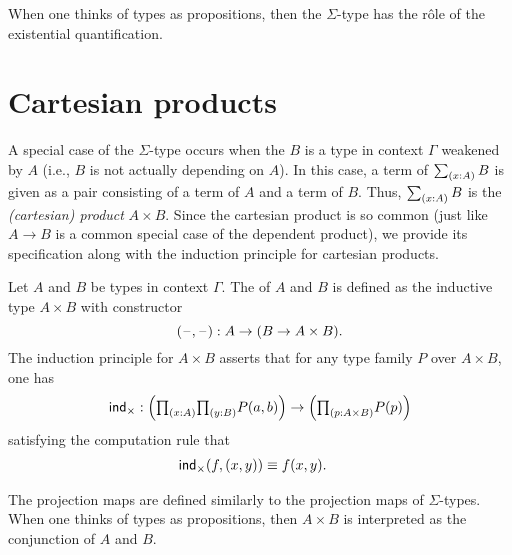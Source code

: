 When one thinks of types as propositions, then the $\Sigma$-type has the r\^{o}le of the existential quantification.

\section{Cartesian products}
A special case of the $\Sigma$-type occurs when the $B$ is a type in context $\Gamma$ weakened by $A$ (i.e., $B$ is not actually depending on $A$). In this case, a term of $\sm{x:A}B$ is given as a pair consisting of a term of $A$ and a term of $B$. Thus, $\sm{x:A}B$ is the \emph{(cartesian) product} $A\times B$. Since the cartesian product is so common (just like $A\to B$ is a common special case of the dependent product), we provide its specification along with the induction principle for cartesian products.

\begin{defn}
Let $A$ and $B$ be types in context $\Gamma$. The  of $A$ and $B$ is defined as the inductive type $A\times B$ with constructor
\begin{equation*}
{\mathopen{}(\mathord{\hspace{1pt}\text{--}\hspace{1pt}},\mathord{\hspace{1pt}\text{--}\hspace{1pt}})\mathclose{}}:A\to (B\to A\times B).
\end{equation*}
The induction principle for $A\times B$ asserts that for any type family $P$ over $A\times B$, one has
\begin{equation*}
\ind{\times} : \Big(\prd{x:A}{y:B}P(a,b)\Big)\to\Big(\prd{p:A\times B} P(p)\Big)
\end{equation*}
satisfying the computation rule that
\begin{align*}
\mathsf{ind}_{\times}(f,(x,y)) & \equiv f(x,y).
\end{align*}
\end{defn}

The projection maps are defined similarly to the projection maps of $\Sigma$-types. When one thinks of types as propositions, then $A\times B$ is interpreted as the conjunction of $A$ and $B$.

